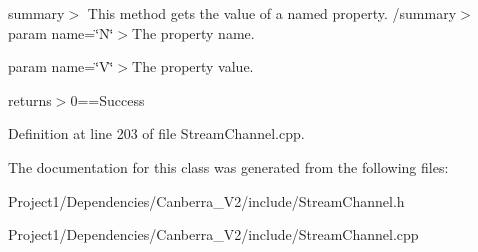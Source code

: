 summary$>$ This method gets the value of a named property. /summary$>$ param name=\char`\"{}\+N\char`\"{}$>$The property name.

param name=\char`\"{}\+V\char`\"{}$>$The property value.

returns$>$0==Success

Definition at line 203 of file Stream\+Channel.\+cpp.



The documentation for this class was generated from the following files\+:\begin{DoxyCompactItemize}
\item 
Project1/\+Dependencies/\+Canberra\+\_\+\+V2/include/Stream\+Channel.\+h\item 
Project1/\+Dependencies/\+Canberra\+\_\+\+V2/include/Stream\+Channel.\+cpp\end{DoxyCompactItemize}
